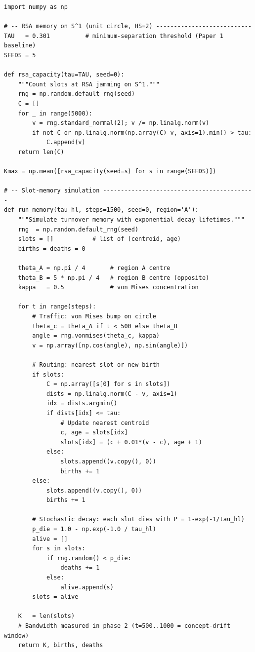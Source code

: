 \documentclass[11pt]{article}
\begin{document}
\begin{lstlisting}[caption={paper2\_bandwidth\_repro.py}]
import numpy as np

# -- RSA memory on S^1 (unit circle, HS=2) ---------------------------
TAU   = 0.301          # minimum-separation threshold (Paper 1 baseline)
SEEDS = 5

def rsa_capacity(tau=TAU, seed=0):
    """Count slots at RSA jamming on S^1."""
    rng = np.random.default_rng(seed)
    C = []
    for _ in range(5000):
        v = rng.standard_normal(2); v /= np.linalg.norm(v)
        if not C or np.linalg.norm(np.array(C)-v, axis=1).min() > tau:
            C.append(v)
    return len(C)

Kmax = np.mean([rsa_capacity(seed=s) for s in range(SEEDS)])

# -- Slot-memory simulation -------------------------------------------
def run_memory(tau_hl, steps=1500, seed=0, region='A'):
    """Simulate turnover memory with exponential decay lifetimes."""
    rng  = np.random.default_rng(seed)
    slots = []           # list of (centroid, age)
    births = deaths = 0

    theta_A = np.pi / 4       # region A centre
    theta_B = 5 * np.pi / 4   # region B centre (opposite)
    kappa   = 0.5             # von Mises concentration

    for t in range(steps):
        # Traffic: von Mises bump on circle
        theta_c = theta_A if t < 500 else theta_B
        angle = rng.vonmises(theta_c, kappa)
        v = np.array([np.cos(angle), np.sin(angle)])

        # Routing: nearest slot or new birth
        if slots:
            C = np.array([s[0] for s in slots])
            dists = np.linalg.norm(C - v, axis=1)
            idx = dists.argmin()
            if dists[idx] <= tau:
                # Update nearest centroid
                c, age = slots[idx]
                slots[idx] = (c + 0.01*(v - c), age + 1)
            else:
                slots.append((v.copy(), 0))
                births += 1
        else:
            slots.append((v.copy(), 0))
            births += 1

        # Stochastic decay: each slot dies with P = 1-exp(-1/tau_hl)
        p_die = 1.0 - np.exp(-1.0 / tau_hl)
        alive = []
        for s in slots:
            if rng.random() < p_die:
                deaths += 1
            else:
                alive.append(s)
        slots = alive

    K   = len(slots)
    # Bandwidth measured in phase 2 (t=500..1000 = concept-drift window)
    return K, births, deaths


\end{lstlisting}
\end{document}
